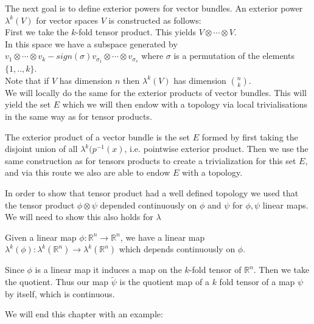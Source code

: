 \documentclass[../Thesis.tex]{subfiles}
\begin{document}
The next goal is to define exterior powers for vector bundles. An exterior power $\lambda^k(V)$ for vector spaces $V$ is constructed as follows:
\\First we take the $k$-fold tensor product. This yields $V \otimes \cdots \otimes V$.
\\In this space we have a subspace generated by $v_1 \otimes \cdots \otimes v_k - sign(\sigma) v_{\sigma_1} \otimes \cdots \otimes v_{\sigma_v}$ where $\sigma$ is a permutation of the elements $\{1, .., k\}$.
\\Note that if $V$ has dimension $n$ then $\lambda^k(V)$ has dimension $\binom{n}{k}$.
\\We will locally do the same for the exterior products of vector bundles. This will yield the set $E$ which we will then endow with a topology via local trivialisations in the same way as for tensor products.
\begin{mydef}
The exterior product of a vector bundle is the set $E$ formed by first taking the disjoint union of all $\lambda^k(p^{-1}(x)$, i.e. pointwise exterior product. Then we use the same construction as for tensors products to create a trivialization for this set $E$, and via this route we also are able to endow $E$ with a topology.
\end{mydef}
In order to show that tensor product had a well defined topology we used that the tensor product $\phi \otimes \psi$ depended continuously on $\phi$ and $\psi$ for $\phi, \psi$ linear maps. We will need to show this also holds for $\lambda$
\begin{lemma}
Given a linear map $\phi : \mathbb{R}^n \rightarrow \mathbb{R}^n$, we have a linear map $\lambda^k(\phi) : \lambda^k(\mathbb{R}^n) \rightarrow \lambda^k(\mathbb{R}^n)$ which depends continuously on $\phi$.
\end{lemma}
\begin{myproof}
Since $\phi$ is a linear map it induces a map on the $k$-fold tensor of $\mathbb{R}^n$. Then we take the quotient. Thus our map $\tilde{\psi}$ is the quotient map of a $k$ fold tensor of a map $\psi$ by itself, which is continuous.
\end{myproof}
We will end this chapter with an example:
\end{document}
